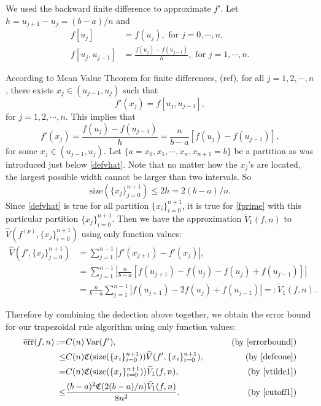 \documentclass{iitthesis}
\DeclareMathOperator{\Var}{Var}
\theoremstyle{definition}
\theoremstyle{remark}
\begin{document}
We used the backward finite difference to approximate $f'$. Let $h=u_{j+1}-u_{j}=(b-a)/n$ and
\begin{align*}
  f[u_{j}]&=f(u_{j}), \text{ for } j=0,\cdots, n,\\
  f[u_{j},u_{j-1}]&=\frac{f(u_{j})-f(u_{j-1})}{h},\text{ for } j=1, \cdots, n.
\end{align*}


According to Mean Value Theorem for finite differences, (ref), for all $j=1,2,\cdots,n$, there exists $x_j\in (u_{j-1},u_{j})$ such that
\begin{equation*}
   f'(x_j)= f[u_{j},u_{j-1}],
\end{equation*}
for $j = 1, 2, \cdots, n.$ This implies that
\begin{equation}\label{fprime}
  f'(x_j)=\frac{f(u_{j})-f(u_{j-1})}{h}=\frac{n}{b-a}[f(u_{j})-f(u_{j-1})],
\end{equation}
for some $x_j\in (u_{j-1},u_{j})$. Let $\{a=x_{0}, x_{1},\cdots,x_{n},x_{n+1}=b\}$ be a partition as was introduced just below \eqref{defvhat}. Note that no matter how the $x_j$'s are located, the largest possible width cannot be larger than two intervals. So
\begin{equation}\label{cutoff1}
  \text{size}(\{x_j\}_{j=0}^{n+1})\leq 2h=2(b-a)/n.
\end{equation}
Since \eqref{defvhat} is true for all partition $\{x_i\}_{i=0}^{n+1}$, it is true for \eqref{fprime} with this particular partition $\{x_j\}_{i=0}^{n+1}$. Then we have the approximation $\widetilde{V}_1(f,n)$ to $\widehat{V}(f^{(p)},\{x_j\}_{i=0}^{n+1})$ using only function values:
\begin{align}\label{vtilde1}
\nonumber    \widehat{V}(f',\{x_j\}_{j=0}^{n+1})&= \sum_{j=1}^{n-1}\left|f'(x_{j+1})-f'(x_{j})\right|,\\
\nonumber    &=\sum_{j=1}^{n-1}\left|\frac{n}{b-a}[f(u_{j+1})-f(u_{j})-f(u_{j})+f(u_{j-1})]\right|\\
    &=\frac{n}{b-a}\sum_{j=1}^{n-1}\left|f(u_{j+1})-2f(u_{j})+f(u_{j-1})\right|=:\widetilde{V}_1(f,n).
\end{align}

Therefore by combining the dedection above together, we obtain the error bound for our trapezoidal rule algorithm using only function values:
\begin{align*}
\overline{\text{err}}(f,n):=&C(n)\Var(f'),\qquad &\text{ (by \eqref{errorbound})}\\
\leq & C(n)\mathfrak{C}(\text{size}(\{x_i\}_{i=0}^{n+1}))\widehat{V}(f',\{x_i\}_{i=0}^{n+1}), \qquad &\text{ (by \eqref{defcone})}\\
=& C(n)\mathfrak{C}(\text{size}(\{x_j\}_{i=0}^{n+1}))\widetilde{V}_1(f,n), \qquad &\text{ (by \eqref{vtilde1})}\\
  \leq & \frac{(b-a)^2\mathfrak{C}(2(b-a)/n)\widetilde{V}_1(f,n)}{8n^2}.\qquad &\text{ (by \eqref{cutoff1})}
\end{align*}
\end{document}
